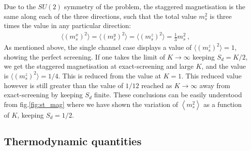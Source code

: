 \documentclass[12pt]{iopart}
\begin{document}
Due to the $SU(2)$ symmetry of the problem, the staggered magnetisation is the same along each of the three directions, such that the total value \(m_s^2\) is three times the value in any particular direction:
\begin{eqnarray}
\langle(m_s^x)^2\rangle=\langle(m_s^y)^2\rangle=\langle(m_s^z)^2\rangle=\frac{1}{3}m_s^2~,
\end{eqnarray}
As mentioned above, the single channel case displays a value of $\langle (m_s^z)^2 \rangle =1$, showing the perfect screening. If one takes the limit of \(K \to \infty\) keeping \(S_d = K/2\), we get the staggered magnetisation at exact-screening and large \(K\), and the value is $\langle (m_s^z)^2 \rangle =1/4$. This is reduced from the value at \(K=1\). This reduced value however is still greater than the value of \(1/12\) reached as \(K\to \infty\) away from exact-screening by keeping \(S_d\) finite. These conclusions can be easily understood from fig.\ref{fig:st_mag} where we have shown the variation of \(\left<m_s^2 \right>\) as a function of \(K\), keeping \(S_d=1/2\).


\subsection{Thermodynamic quantities}
\end{document}
